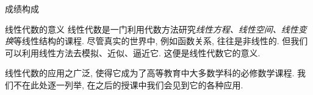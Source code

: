 \begin{frame}[<*>]{成绩构成}
\begin{center}
\end{center}
\end{frame}


\begin{frame}{线性代数的意义}
	\onslide<+->
	线性代数是一门利用\alert{代数方法}研究\emph{线性方程、线性空间、线性变换}等线性结构的课程.
	\onslide<+->
	尽管真实的世界中, 例如函数关系, 往往是非线性的.
	但我们可以利用线性方法去模拟、近似、逼近它.
	\onslide<+->
	这便是线性代数它的意义.

	\onslide<+->
	线性代数的应用之广泛, 使得它成为了高等教育中大多数学科的必修数学课程.
	\onslide<+->
	我们不在此处逐一列举, 在之后的授课中我们会见到它的各种应用.
\end{frame}


